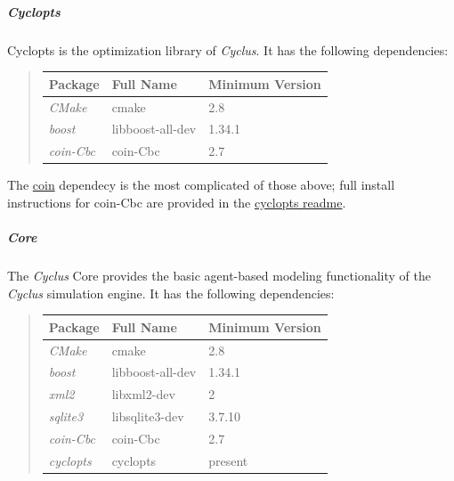 \documentclass[letterpaper,10pt,english]{sphinxmanual}
\begin{document}
\subparagraph{Cyclopts}
\label{devdoc/get_and_build:id1}
Cyclopts is the optimization library of \emph{Cyclus}. It has the following
dependencies:
\begin{quote}

\begin{tabulary}{\linewidth}{|L|L|L|}
\hline
\textbf{
Package
} & \textbf{
Full Name
} & \textbf{
Minimum Version
}\\\hline

\emph{CMake}
 & 
cmake
 & 
2.8
\\\hline

\emph{boost}
 & 
libboost-all-dev
 & 
1.34.1
\\\hline

\emph{coin-Cbc}
 & 
coin-Cbc
 & 
2.7
\\\hline
\end{tabulary}

\end{quote}

The \href{https://projects.coin-or.org/Cbc}{coin} dependecy is the most
complicated of those above; full install instructions for coin-Cbc
are provided in the \href{https://github.com/cyclus/cyclopts}{cyclopts readme}.


\subparagraph{Core}
\label{devdoc/get_and_build:core}
The \emph{Cyclus} Core provides the basic agent-based modeling
functionality of the \emph{Cyclus} simulation engine. It has the
following dependencies:
\begin{quote}

\begin{tabulary}{\linewidth}{|L|L|L|}
\hline
\textbf{
Package
} & \textbf{
Full Name
} & \textbf{
Minimum Version
}\\\hline

\emph{CMake}
 & 
cmake
 & 
2.8
\\\hline

\emph{boost}
 & 
libboost-all-dev
 & 
1.34.1
\\\hline

\emph{xml2}
 & 
libxml2-dev
 & 
2
\\\hline

\emph{sqlite3}
 & 
libsqlite3-dev
 & 
3.7.10
\\\hline

\emph{coin-Cbc}
 & 
coin-Cbc
 & 
2.7
\\\hline

\emph{cyclopts}
 & 
cyclopts
 & 
present
\\\hline
\end{tabulary}

\end{quote}
\end{document}
